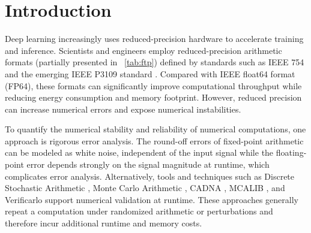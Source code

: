 \documentclass[manuscript, screen]{acmart}
\begin{document}


\maketitle


\section{Introduction}

Deep learning increasingly uses reduced-precision hardware to accelerate training and inference. Scientists and engineers employ reduced-precision arithmetic formats (partially presented in \tablename~\ref{tab:ftp}) defined by standards such as IEEE 754 \cite{ieee754-2019} and the emerging IEEE P3109 standard \cite{ieee_p3109_interim}. Compared with IEEE float64 format (FP64), these formats can significantly improve computational throughput while reducing energy consumption and memory footprint. However, reduced precision can increase numerical errors and expose numerical instabilities.

To quantify the numerical stability and reliability of numerical computations, one approach is rigorous error analysis. The round-off errors of fixed-point arithmetic can be modeled as white noise, independent of the input signal while the floating-point error depends strongly on the signal magnitude at runtime, which complicates error analysis.  Alternatively, tools and techniques such as Discrete Stochastic Arithmetic \citep{Vignes2004}, Monte Carlo Arithmetic \citep{parker1997mca}, CADNA \citep{Jez2008}, MCALIB \citep{frechtling2015mcalib}, and  Verificarlo \citep{denis2016verificarlo} support numerical validation at runtime. These approaches generally repeat a computation under randomized arithmetic or perturbations and therefore incur additional runtime and memory costs.
\end{document}
